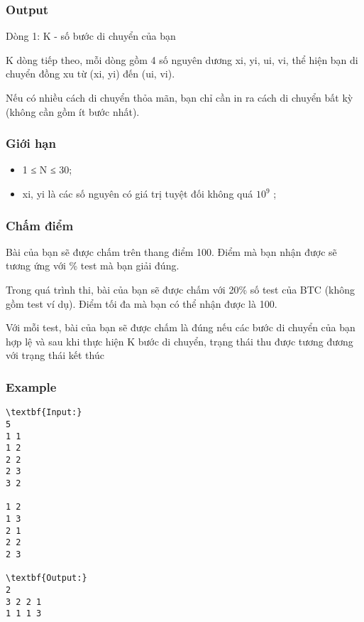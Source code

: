 \subsubsection{   Output  }

   Dòng 1: K - số bước di chuyển của bạn  

   K dòng tiếp theo, mỗi dòng gồm 4 số nguyên dương xi, yi, ui, vi, thể hiện bạn di chuyển đồng xu từ (xi, yi) đến (ui, vi).  

   Nếu có nhiều cách di chuyển thỏa mãn, bạn chỉ cần in ra cách di chuyển bất kỳ (không cần gồm ít bước nhất).  

\subsubsection{   Giới hạn  }
\begin{itemize}
	\item     1 ≤ N ≤ 30;   
	\item     xi, yi là các số nguyên có giá trị tuyệt đối không quá $10^{9}$    ;   
\end{itemize}

\subsubsection{   Chấm điểm  }

   Bài của bạn sẽ được chấm trên thang điểm 100. Điểm mà bạn nhận được sẽ tương ứng với \% test mà bạn giải đúng.  

   Trong quá trình thi, bài của bạn sẽ được chấm với 20\% số test của BTC (không gồm test ví dụ). Điểm tối đa mà bạn có thể nhận được là 100.  

   Với mỗi test, bài của bạn sẽ được chấm là đúng nếu các bước di chuyển của bạn hợp lệ và sau khi thực hiện K bước di chuyển, trạng thái thu được tương đương với trạng thái kết thúc  

\subsubsection{   Example  }
\begin{verbatim}
\textbf{Input:}
5
1 1
1 2
2 2
2 3
3 2

1 2
1 3
2 1
2 2
2 3

\textbf{Output:}
2
3 2 2 1
1 1 1 3
\end{verbatim}
